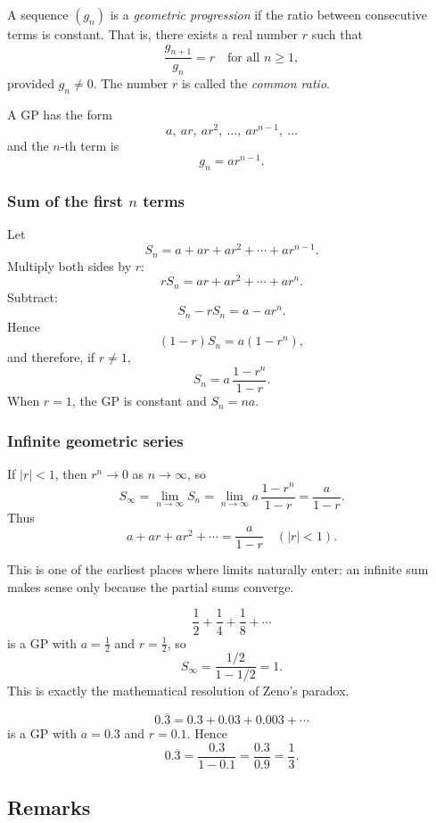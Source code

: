 \begin{definition}
A sequence $(g_n)$ is a \emph{geometric progression} if the ratio between
consecutive terms is constant.  That is, there exists a real number $r$
such that
\[
\frac{g_{n+1}}{g_n}=r\quad\text{for all }n\ge 1,
\]
provided $g_n\neq 0$.
The number $r$ is called the \emph{common ratio}.
\end{definition}

A GP has the form
\[
a,\ ar,\ ar^2,\ \dots,\ ar^{n-1},\ \dots
\]
and the $n$-th term is
\[
g_n=ar^{n-1}.
\]

\subsubsection*{Sum of the first $n$ terms}

Let
\[
S_n = a + ar + ar^2 + \cdots + ar^{n-1}.
\]
Multiply both sides by $r$:
\[
rS_n = ar + ar^2 + \cdots + ar^{n}.
\]
Subtract:
\[
S_n - rS_n = a - ar^{n}.
\]
Hence
\[
(1-r)S_n = a(1-r^n),
\]
and therefore, if $r\neq 1$,
\[
\boxed{\displaystyle
S_n = a\,\frac{1-r^{n}}{1-r}.
}
\]
When $r=1$, the GP is constant and $S_n=na$.

\subsubsection*{Infinite geometric series}

If $|r|<1$, then $r^n\to 0$ as $n\to\infty$, so
\[
S_\infty
=\lim_{n\to\infty} S_n
=\lim_{n\to\infty} a\,\frac{1-r^n}{1-r}
=\frac{a}{1-r}.
\]
Thus
\[
\boxed{\displaystyle
a+ar+ar^2+\cdots = \frac{a}{1-r}\quad (|r|<1).
}
\]

This is one of the earliest places where limits naturally enter: an infinite
sum makes sense only because the partial sums converge.


\begin{example}
\[
\frac12+\frac14+\frac18+\cdots
\]
is a GP with $a=\tfrac12$ and $r=\tfrac12$, so
\[
S_\infty = \frac{1/2}{1-1/2}=1.
\]
This is exactly the mathematical resolution of Zeno’s paradox.
\end{example}

\begin{example}
\[
0.\overline{3}=0.3+0.03+0.003+\cdots
\]
is a GP with $a=0.3$ and $r=0.1$. Hence
\[
0.\overline{3} = \frac{0.3}{1-0.1}=\frac{0.3}{0.9}=\frac13.
\]
\end{example}

\subsection*{Remarks}


